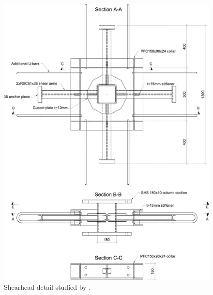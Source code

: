 \begin{figure}\centering
    \includegraphics[width=\columnwidth]{Figures/e2012f2.png}
    \caption{Shearhead detail studied by \cite{EDER2012239}.}
    \label{e2012f2}
    \end{figure}
